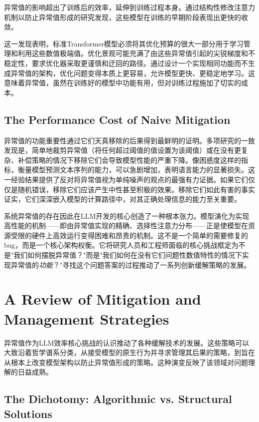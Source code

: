 \documentclass{article}
\begin{document}
异常值的影响超出了训练后的效率，延伸到训练过程本身。通过结构性修改注意力机制以防止异常值形成的研究发现，这些模型在训练的早期阶段表现出更快的收敛。

这一发现表明，标准Transformer模型必须将其优化预算的很大一部分用于学习管理和利用这些数值极端值。优化景观可能充满了由这些异常值引起的尖锐梯度和不稳定性，要求优化器采取更谨慎和迂回的路径。通过设计一个实现相同功能而不生成异常值的架构，优化问题变得本质上更容易，允许模型更快、更稳定地学习。这意味着异常值，虽然在训练好的模型中功能有用，但对训练过程施加了切实的成本。

\subsection{The Performance Cost of Naive Mitigation}

异常值的功能重要性通过它们天真移除的后果得到最鲜明的证明。多项研究的一致发现是，简单地裁剪异常值（将任何超过阈值的值设置为该阈值）或在没有更复杂、补偿策略的情况下移除它们会导致模型性能的严重下降。像困惑度这样的指标，衡量模型预测文本序列的能力，可以急剧增加，表明语言能力的显著损失。这一经验结果提供了反对将异常值视为单纯噪声的观点的最强有力证据。如果它们仅仅是随机错误，移除它们应该产生中性甚至积极的效果。移除它们如此有害的事实证实，它们深深嵌入模型的计算路径中，对其正确处理信息的能力至关重要。

系统异常值的存在因此在LLM开发的核心创造了一种根本张力。模型演化为实现高性能的机制——即由异常值实现的精确、选择性注意力分布——正是使模型在资源受限的硬件上高效运行变得困难和昂贵的机制。这不是一个简单的需要修复的bug，而是一个核心架构权衡。它将研究人员和工程师面临的核心挑战框定为不是"我们如何摆脱异常值？"而是"我们如何在没有它们问题性数值特性的情况下实现异常值的\emph{功能}？"寻找这个问题答案的过程推动了一系列创新缓解策略的发展。

\section{A Review of Mitigation and Management Strategies}

异常值作为LLM效率核心挑战的认识推动了各种缓解技术的发展。这些策略可以大致沿着哲学谱系分类，从接受模型的原生行为并寻求管理其后果的策略，到旨在从根本上改变模型架构以防止异常值形成的策略。这种演变反映了该领域对问题理解的日益成熟。

\subsection{The Dichotomy: Algorithmic vs. Structural Solutions}
\end{document}
